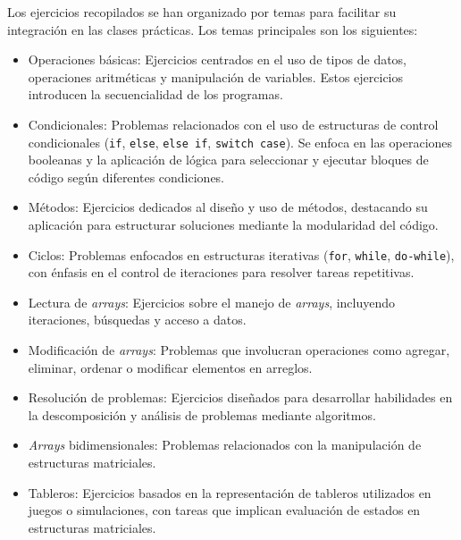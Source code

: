 Los ejercicios recopilados se han organizado por temas para facilitar su integración en las clases prácticas. Los temas principales son los siguientes: 

\begin{itemize}  
    \item Operaciones básicas:  
    Ejercicios centrados en el uso de tipos de datos, operaciones aritméticas y manipulación de variables. Estos ejercicios introducen la secuencialidad de los programas.  

    \item Condicionales:  
    Problemas relacionados con el uso de estructuras de control condicionales (\texttt{if}, \texttt{else}, \texttt{else if}, \texttt{switch case}). Se enfoca en las operaciones booleanas y la aplicación de lógica para seleccionar y ejecutar bloques de código según diferentes condiciones.

    \item Métodos:
    Ejercicios dedicados al diseño y uso de métodos, destacando su aplicación para estructurar soluciones mediante la modularidad del código.  

    \item Ciclos:  
    Problemas enfocados en estructuras iterativas (\texttt{for}, \texttt{while}, \texttt{do-while}), con énfasis en el control de iteraciones para resolver tareas repetitivas.

    \item Lectura de \textit{arrays}:  
    Ejercicios sobre el manejo de \textit{arrays}, incluyendo iteraciones, búsquedas y acceso a datos.  

    \item Modificación de \textit{arrays}:  
    Problemas que involucran operaciones como agregar, eliminar, ordenar o modificar elementos en arreglos.  

    \item Resolución de problemas:  
    Ejercicios diseñados para desarrollar habilidades en la descomposición y análisis de problemas mediante algoritmos.

    \item \textit{Arrays} bidimensionales:  
    Problemas relacionados con la manipulación de estructuras matriciales.  

    \item Tableros:  
    Ejercicios basados en la representación de tableros utilizados en juegos o simulaciones, con tareas que implican evaluación de estados en estructuras matriciales.
\end{itemize}  

